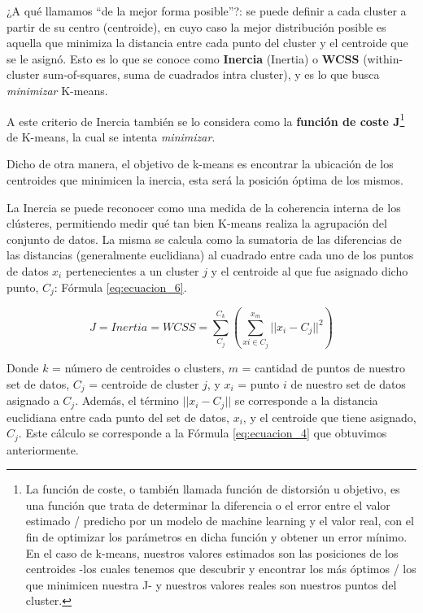 \documentclass[12pt,a4paper]{article}
\begin{document}
\begin{sloppypar}
¿A qué llamamos “de la mejor forma posible”?: se puede definir a cada cluster a partir de su centro (centroide), en cuyo caso la mejor distribución posible es aquella que minimiza la distancia entre cada punto del cluster y el centroide que se le asignó. Esto es lo que se conoce como \textbf{Inercia} (Inertia) o \textbf{WCSS} (within-cluster sum-of-squares, suma de cuadrados intra cluster), y es lo que busca \textit{minimizar} K-means.

A este criterio de Inercia también se lo considera como la \textbf{función de coste J}\footnote{La función de coste, o también llamada función de distorsión u objetivo, es una función que trata de determinar la diferencia o el error entre el valor estimado / predicho por un modelo de machine learning y el valor real, con el fin de optimizar los parámetros en dicha función y obtener un error mínimo. En el caso de k-means, nuestros valores estimados son las posiciones de los centroides -los cuales tenemos que descubrir y encontrar los más óptimos / los que minimicen nuestra J- y nuestros valores reales son nuestros puntos del cluster.} de K-means, la cual se intenta \textit{minimizar}. 

Dicho de otra manera, el objetivo de k-means es encontrar la ubicación de los centroides que minimicen la inercia, esta será la posición óptima de los mismos.

La Inercia\cite{K_means_experiment} se puede reconocer como una medida de la coherencia interna de los clústeres, permitiendo medir qué tan bien K-means realiza la agrupación del conjunto de datos. La misma se calcula como la sumatoria de las diferencias de las distancias (generalmente euclidiana) al cuadrado entre cada uno de los puntos de datos $x_{i}$ pertenecientes a un cluster $j$ y el centroide al que fue asignado dicho punto, $C_{j}$: Fórmula \ref{eq:ecuacion_6}.

\begin{equation}\label{eq:ecuacion_6}
J = Inertia = WCSS = \sum_{C_{j}}^{C_{k}}  ( \sum_{xi \in C_{j}}^{x_{m}}||x_{i}-C_{j}||^2)
\end{equation}

Donde $k$ = número de centroides o clusters, $m$ = cantidad de puntos de nuestro set de datos, $C_{j}$ = centroide de cluster $j$, y $x_{i}$ = punto $i$ de nuestro set de datos asignado a $C_{j}$. Además, el término $||x_{i}-C_{j}||$ se corresponde a la distancia euclidiana entre cada punto del set de datos, $x_{i}$, y el centroide que tiene asignado, $C_{j}$. Este cálculo se corresponde a la Fórmula \ref{eq:ecuacion_4} que obtuvimos anteriormente.


\end{sloppypar}
\end{document}

